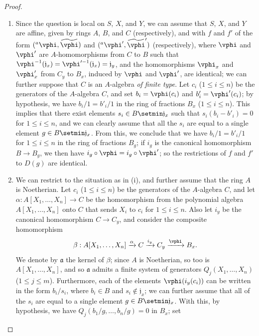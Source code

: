 \begin{proof}
\medskip\noindent
\begin{enumerate}
  \item[(i)] Since the question is local on $S$, $X$, and $Y$, we can assume that $S$, $X$, and $Y$ are affine, given by rings $A$, $B$, and $C$ (respectively), and with $f$ and $f'$ of the form $({}^a\vphi,\widetilde{\vphi})$ and $({}^a\vphi',\widetilde{\vphi}')$ (respectively), where $\vphi$ and $\vphi'$ are $A$-homomorphisms from $C$ to $B$ such that $\vphi^{-1}(\mathfrak{j}_x)=\vphi'^{-1}(\mathfrak{j}_x)=\mathfrak{j}_y$, and the homomorphisms $\vphi_x$ and $\vphi'_x$ from $C_y$ to $B_x$, induced by $\vphi$ and $\vphi'$, are identical;
    we can further suppose that $C$ is an $A$-algebra \emph{of finite type}.
    Let $c_i$ ($1\leq i\leq n$) be the generators of the $A$-algebra $C$, and set $b_i=\vphi(c_i)$ and $b'_i=\vphi'(c_i)$;
    by hypothesis, we have $b_i/1=b'_i/1$ in the ring of fractions $B_x$ ($1\leq i\leq n$).
    This implies that there exist elements $s_i\in B\setmin\mathfrak{j}_x$ such that $s_i(b_i-b'_i)=0$ for $1\leq i\leq n$, and we can clearly assume that all the $s_i$ are equal to a single element $g\in B\setmin\mathfrak{j}_x$.
    From this, we conclude that we have $b_i/1=b'_i/1$ for $1\leq i\leq n$ in the ring of fractions $B_g$;
    if $i_g$ is the canonical homomorphism $B\to B_g$, we then have $i_g\circ\vphi=i_g\circ\vphi'$;
    so the restrictions of $f$ and $f'$ to $D(g)$ are identical.
  \item[(ii)] We can restrict to the situation as in (i), and further assume that the ring $A$ is Noetherian.
    Let $c_i$ ($1\leq i\leq n$) be the generators of the $A$-algebra $C$, and let $\alpha:A[X_1,\ldots,X_n]\to C$ be the homomorphism from the polynomial algebra $A[X_1,\ldots,X_n]$ onto $C$ that sends $X_i$ to $c_i$ for $1\leq i\leq n$.
    Also let $i_y$ be the canonical homomorphism $C\to C_y$, and consider the composite homomorphism
    \[
      \beta:A[X_1,\ldots,X_n] \xrightarrow{\alpha} C \xrightarrow{i_y} C_y \xrightarrow{\vphi} B_x.
    \]
    We denote by $\mathfrak{a}$ the kernel of $\beta$;
    since $A$ is Noetherian, so too is $A[X_1,\ldots,X_n]$, and so $\mathfrak{a}$ admits a finite system of generators $Q_j(X_1,\ldots,X_n)$ ($1\leq j\leq m$).
    Furthermore, each of the elements $\vphi(i_y(c_i))$ can be written in the form $b_i/s_i$, where $b_i\in B$ and $s_i\not\in\mathfrak{j}_x$;
    we can further assume that all of the $s_i$ are equal to a single element $g\in B\setmin\mathfrak{j}_x$.
    With this, by hypothesis, we have $Q_j(b_1/g,\ldots,b_n/g)=0$ in $B_x$; set

\end{enumerate}
\end{proof}
